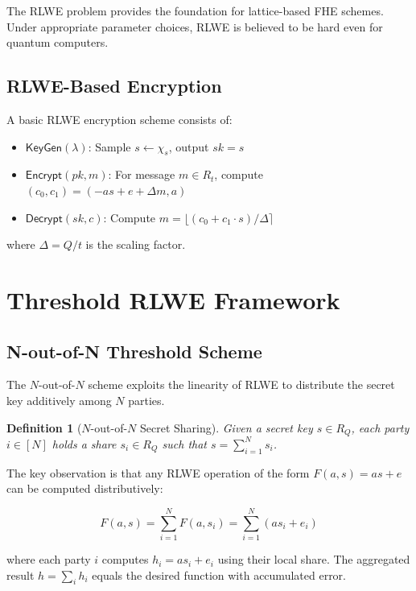 \documentclass[11pt,a4paper]{article}
\newtheorem{definition}[theorem]{Definition}
\begin{document}
The RLWE problem provides the foundation for lattice-based FHE schemes. Under appropriate parameter choices, RLWE is believed to be hard even for quantum computers.

\subsection{RLWE-Based Encryption}

A basic RLWE encryption scheme consists of:
\begin{itemize}
    \item $\textsf{KeyGen}(\lambda)$: Sample $s \leftarrow \chi_s$, output $sk = s$
    \item $\textsf{Encrypt}(pk, m)$: For message $m \in R_t$, compute $(c_0, c_1) = (-as + e + \Delta m, a)$
    \item $\textsf{Decrypt}(sk, c)$: Compute $m = \lfloor (c_0 + c_1 \cdot s) / \Delta \rceil$
\end{itemize}
where $\Delta = Q/t$ is the scaling factor.

\section{Threshold RLWE Framework}

\subsection{N-out-of-N Threshold Scheme}

The $N$-out-of-$N$ scheme exploits the linearity of RLWE to distribute the secret key additively among $N$ parties.

\begin{definition}[$N$-out-of-$N$ Secret Sharing]
Given a secret key $s \in R_Q$, each party $i \in [N]$ holds a share $s_i \in R_Q$ such that $s = \sum_{i=1}^{N} s_i$.
\end{definition}

The key observation is that any RLWE operation of the form $F(a, s) = as + e$ can be computed distributively:

\begin{equation}
F(a, s) = \sum_{i=1}^{N} F(a, s_i) = \sum_{i=1}^{N} (as_i + e_i)
\end{equation}

where each party $i$ computes $h_i = as_i + e_i$ using their local share. The aggregated result $h = \sum_i h_i$ equals the desired function with accumulated error.
\end{document}
